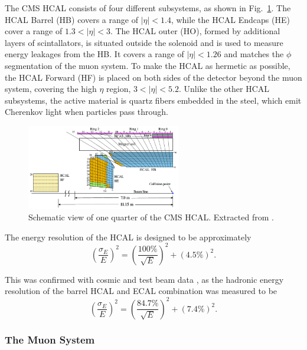 \documentclass[../main.tex]{subfiles}
\begin{document}
The CMS HCAL consists of four different subsystems, as shown in Fig.~\ref{intro:fig:hcal}. The HCAL Barrel (HB) covers a range of $|\eta|<1.4$, while the HCAL Endcaps (HE) cover a range of $1.3<|\eta|<3$. The HCAL outer (HO), formed by additional layers of scintallators, is situated outside the solenoid and is used to measure energy leakages from the HB. It covers a range of $|\eta|<1.26$ and matches the $\phi$ segmentation of the muon system. To make the HCAL as hermetic as possible, the HCAL Forward (HF) is placed on both sides of the detector beyond the muon system, covering the high $\eta$ region, $3 < |\eta| < 5.2$. Unlike the other HCAL subsystems, the active material is quartz fibers embedded in the steel, which emit Cherenkov light when particles pass through.

\begin{figure}[h!]
\begin{center}
\includegraphics[width=0.6\textwidth]{Images/hcal}
\end{center}
\caption[CMS HCAL structure]{Schematic view of one quarter of the CMS HCAL. Extracted from \cite{intro:exp:hcal}.}
\label{intro:fig:hcal}
\end{figure}

The energy resolution of the HCAL is designed to be approximately
\begin{equation}
\left(\frac{\sigma_E}{E}\right)^2 = \left(\frac{100\%}{\sqrt{E}}\right)^2 + (4.5\%)^2.
\end{equation}

This was confirmed with cosmic and test beam data \cite{intro:exp:hcal_res}, as the hadronic energy resolution of the barrel HCAL and ECAL combination was measured to be
\begin{equation}
\left(\frac{\sigma_E}{E}\right)^2 = \left(\frac{84.7\%}{\sqrt{E}}\right)^2 + (7.4\%)^2.
\end{equation}

\subsubsection{The Muon System}
\label{intro:sec:subdet_muon}
\end{document}

